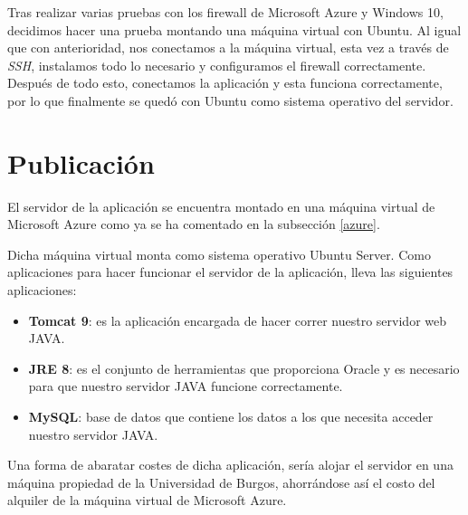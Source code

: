 Tras realizar varias pruebas con los firewall de Microsoft Azure y Windows 10, decidimos hacer una prueba montando una máquina virtual con Ubuntu. Al igual que con anterioridad, nos conectamos a la máquina virtual, esta vez a través de \textit{SSH}, instalamos todo lo necesario y configuramos el firewall correctamente. Después de todo esto, conectamos la aplicación y esta funciona correctamente, por lo que finalmente se quedó con Ubuntu como sistema operativo del servidor.

\section{Publicación}

El servidor de la aplicación se encuentra montado en una máquina virtual de Microsoft Azure como ya se ha comentado en la subsección \ref{azure}.

Dicha máquina virtual monta como sistema operativo Ubuntu Server. Como aplicaciones para hacer funcionar el servidor de la aplicación, lleva las siguientes aplicaciones:

\begin{itemize}
	\tightlist
	\item 
	\textbf{Tomcat 9}: es la aplicación encargada de hacer correr nuestro servidor web JAVA.
	\item 
	\textbf{JRE 8}: es el conjunto de herramientas que proporciona Oracle y es necesario para que nuestro servidor JAVA funcione correctamente.
	\item 
	\textbf{MySQL}: base de datos que contiene los datos a los que necesita acceder nuestro servidor JAVA.
\end{itemize}

Una forma de abaratar costes de dicha aplicación, sería alojar el servidor en una máquina propiedad de la Universidad de Burgos, ahorrándose así el costo del alquiler de la máquina virtual de Microsoft Azure.